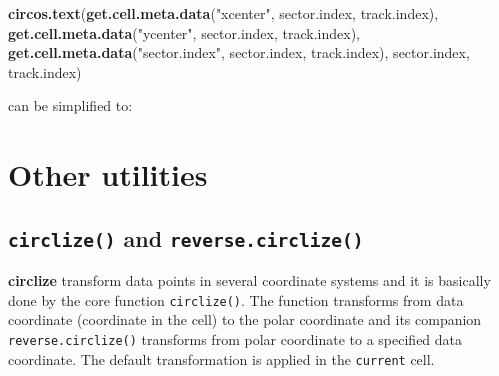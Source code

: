\documentclass[]{book}
\newenvironment{Shaded}{\begin{snugshade}}{\end{snugshade}}
\newcommand{\KeywordTok}[1]{\textcolor[rgb]{0.13,0.29,0.53}{\textbf{#1}}}
\newcommand{\StringTok}[1]{\textcolor[rgb]{0.31,0.60,0.02}{#1}}
\newcommand{\CommentTok}[1]{\textcolor[rgb]{0.56,0.35,0.01}{\textit{#1}}}
\newcommand{\OperatorTok}[1]{\textcolor[rgb]{0.81,0.36,0.00}{\textbf{#1}}}
\newcommand{\NormalTok}[1]{#1}
\begin{document}
\begin{Shaded}
\begin{Highlighting}[]
\KeywordTok{circos.text}\NormalTok{(}\KeywordTok{get.cell.meta.data}\NormalTok{(}\StringTok{"xcenter"}\NormalTok{, sector.index, track.index),}
            \KeywordTok{get.cell.meta.data}\NormalTok{(}\StringTok{"ycenter"}\NormalTok{, sector.index, track.index),}
            \KeywordTok{get.cell.meta.data}\NormalTok{(}\StringTok{"sector.index"}\NormalTok{, sector.index, track.index),}
\NormalTok{            sector.index, track.index)}
\end{Highlighting}
\end{Shaded}

can be simplified to:

\begin{Shaded}
\end{Shaded}

\section{Other utilities}\label{other-utilities}

\subsection{\texorpdfstring{\texttt{circlize()} and
\texttt{reverse.circlize()}}{circlize() and reverse.circlize()}}\label{circlize_and_reverse_circlize}

\textbf{circlize} transform data points in several coordinate systems
and it is basically done by the core function \texttt{circlize()}. The
function transforms from data coordinate (coordinate in the cell) to the
polar coordinate and its companion \texttt{reverse.circlize()}
transforms from polar coordinate to a specified data coordinate. The
default transformation is applied in the \texttt{current} cell.
\end{document}
